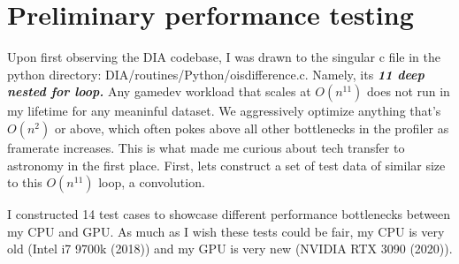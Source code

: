 \documentclass[%
 reprint,
 amsmath,amssymb,
 aps,
showkeys,
]{revtex4-2}
\begin{document}
\section{Preliminary performance testing}

Upon first observing the DIA codebase, I was drawn to the singular c file in the python directory: DIA/routines/Python/oisdifference.c. Namely, its \textbf{\textit{11 deep nested for loop.}} Any gamedev workload that scales at $O(n^{11})$ does not run in my lifetime for any meaninful dataset. We aggressively optimize anything that's $O(n^2)$ or above, which often pokes above all other bottlenecks in the profiler as framerate increases. This is what made me curious about tech transfer to astronomy in the first place. First, lets construct a set of test data of similar size to this $O(n^{11})$ loop, a convolution.

I constructed 14 test cases to showcase different performance bottlenecks between my CPU and GPU. As much as I wish these tests could be fair, my CPU is very old (Intel i7 9700k (2018)) and my GPU is very new (NVIDIA RTX 3090 (2020)). 

\end{document}
